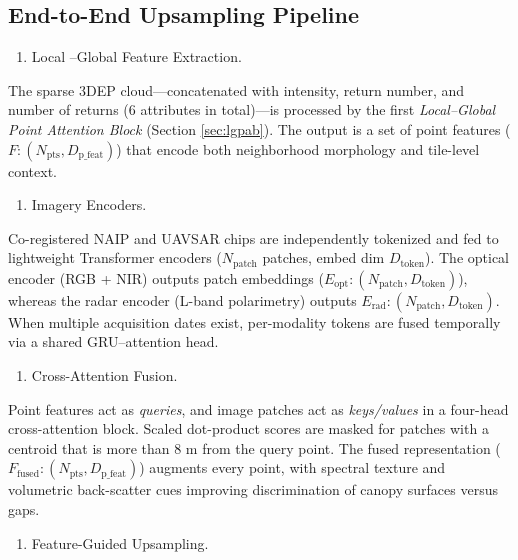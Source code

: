 \documentclass[remotesensing,article,accept,pdftex,moreauthors]{Definitions/mdpi}
\begin{document}
\newpage

\subsection{End-to-End Upsampling Pipeline}
\label{sec:pipeline}


\begin{enumerate}
\item[(1)] {Local
–Global Feature Extraction.}
\end{enumerate}

The sparse 3DEP cloud—concatenated with intensity, return number, and number of returns (6 attributes in total)—is processed by the first \emph{Local–Global Point Attention Block} (Section \ref{sec:lgpab}). The output is a set of point features ($F: (N_{\text{pts}}, D_{\text{p\_feat}})$) that encode both neighborhood morphology and tile-level context.


\begin{enumerate}
\item[(2)] {Imagery Encoders.}
\end{enumerate}

Co-registered NAIP and UAVSAR chips are independently tokenized and fed to lightweight Transformer encoders ($N_{\text{patch}}$ patches, embed dim $D_{\text{token}}$). The optical encoder (RGB + NIR) outputs patch embeddings ($E_{\text{opt}}: (N_{\text{patch}}, D_{\text{token}})$), whereas the radar encoder (L-band polarimetry) outputs $E_{\text{rad}}: (N_{\text{patch}}, D_{\text{token}})$. When multiple acquisition dates exist, per-modality tokens are fused temporally via a shared GRU–attention head.

\begin{enumerate}
\item[(3)] {Cross-Attention Fusion.}
\end{enumerate}

Point features act as \emph{queries}, and image patches act as \emph{keys/values}
in a four-head cross-attention block.
Scaled dot-product scores are masked for patches with a centroid that is more than 8 m from the query point. The fused representation ($F_{\text{fused}}: (N_{\text{pts}}, D_{\text{p\_feat}})$) augments every point, with spectral texture and volumetric back-scatter cues improving discrimination of canopy surfaces versus gaps.

\begin{enumerate}
\item[(4)] {Feature-Guided Upsampling.}
\end{enumerate}
\end{document}
